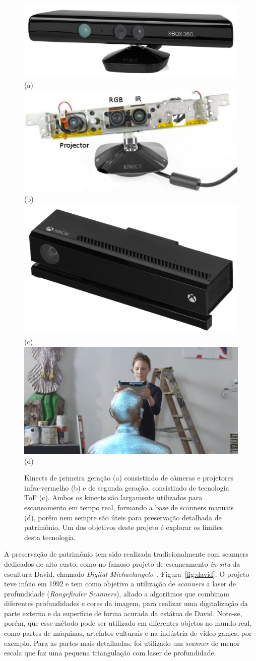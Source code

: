 \begin{figure} [!h]
	\centering
	\includegraphics[width=0.45\linewidth]{figs/Xbox-360-Kinect-Standalone.png}(a)
	\includegraphics[width=0.45\linewidth]{figs/kinect-internals.pdf}(b)
 	\includegraphics[width=0.45\linewidth]{figs/Xbox-One-Kinect.jpg}(c)
 	\includegraphics[width=0.45\linewidth]{figs/kinect-handheld1.png} (d)
	\caption{%
   Kinects de primeira geração (a) consistindo de câmeras e projetores
   infra-vermelho (b) e de segunda geração, consistindo de tecnologia ToF (c). 
   Ambos os kinects são largamente utilizados para escaneamento em tempo real, 
   formando a base de scanners manuais (d), porém nem sempre são úteis para 
   preservação detalhada de patrimônio. Um dos objetivos deste
   projeto é explorar os limites desta tecnologia.
	}\label{fig:kinect}
\end{figure}

A preservação de patrimônio tem sido realizada tradicionalmente com scanners
dedicados de alto custo, como no famoso projeto de escaneamento \emph{in situ} da escultura
David, chamado \emph{Digital Michaelangelo}~\cite{levoy2000digital},
Figura~\ref{fig:david}.  O projeto teve início em 1992 e tem como objetivo a
utilização de \emph{scanners} a laser de profundidade (\emph{Rangefinder Scanners}),
aliado a algoritmos que combinam diferentes profundidades e cores da imagem,
para realizar uma digitalização da parte externa e da superficie de forma
acurada da estátua de David. Note-se, porém, que esse método pode ser utilizado em diferentes
objetos no mundo real, como partes de máquinas, artefatos culturais e na
indústria de video games, por exemplo.  Para as partes mais detalhadas, foi
utilizado um \emph{scanner} de menor escala que faz uma pequena triangulação com
laser de profundidade.

